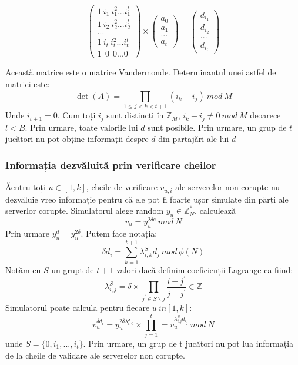 \documentclass[12]{article}
\begin{document}
\[
\left (
\begin{array}{cc}
1 \ i_1 \ i_{1}^{2} ... i_{1}^{t} \\
1 \ i_2 \ i_{2}^{2} ... i_{2}^{t} \\
... \\
1 \ i_t \ i_{t}^{2} ... i_{t}^{t} \\
1 \ \ 0 \ \ 0 ... 0 


\end{array}
\right) 
\times
\left (
\begin{array}{c}
a_0 \\
a_1 \\
... \\
a_t  
\end{array}
\right)
=
\left(
\begin{array}{c}
d_{i_1} \\
d_{i_2} \\
... \\
d_{i_t}
\end{array}
\right)
\]

Această matrice este o matrice Vandermonde. Determinantul unei astfel de matrici este:
$$ \det(A) = \prod_{1 \leqslant j < k <t+1}^{} (i_k - i_j) \ mod \ M$$
Unde $i_{t+1} = 0$. Cum toți $i_j$ sunt distincți în $\mathbb{Z}_{M}$, $i_k - i_j \neq 0 \ mod \ M$ deoarece $l < B$. Prin urmare, toate valorile lui $d$ sunt posibile. Prin urmare, un grup de $t$ jucători nu pot obține informații despre $d$ din partajări ale lui $d$

\subsubsection{Informația dezvăluită prin verificare cheilor}
Ăentru toți $u \in [1,k]$, cheile de verificare $v_{u,i}$ ale serverelor non corupte nu dezvăluie vreo informație pentru că ele pot fi foarte ușor simulate din părți ale serverlor corupte. Simulatorul alege random $y_u \in \mathbb{Z}_{N}^{*}$, calculează 
$$v_u = y_{u}^{2 \delta e} \ mod \ N$$ 
Prin urmare $y_{u}^{d} = y_{u}^{2 \delta}$. Putem face notația: 
$$\delta d_i = \sum_{k=1}^{t+1} \lambda_{i,k}^{S} d_j \ mod \ \phi(N)$$
Notăm cu $S$ un grupt de $t+1$ valori dacă definim coeficienții Lagrange ca fiind:
$$\lambda_{i,j}^{S} = \delta \times \prod_{j^{'} \in S \smallsetminus j}^{} \frac{i - j^{'}}{j - j^{'}} \in \mathbb{Z}  $$
Simulatorul poate calcula pentru fiecare $u \ in [1,k]$:
$$v_{u}^{\delta d_i} = y_{u}^{2 \delta \lambda_{i,0}^{S}}  \times \prod_{j=1}^{t} = v_{u}^{\lambda_{i.j}^{S} d_{i_j}    } \ mod \ N     $$
unde $S = \lbrace 0,i_1,...,i_t \rbrace$. Prin urmare, un grup de t jucători nu pot lua informația de la cheile de validare ale serverelor non corupte.
\end{document}
